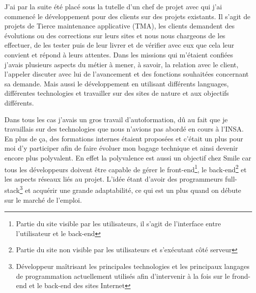 \documentclass[a4paper,11pt,twoside]{report}
\begin{document}
  J'ai par la suite été placé sous la tutelle d'un chef de projet avec qui j'ai commencé le développement pour des clients sur des projets existants. Il s'agit de projets de Tierce maintenance applicative (TMA), les clients demandent des évolutions ou des corrections sur leurs sites et nous nous chargeons de les effectuer, de les tester puis de leur livrer et de vérifier avec eux que cela leur convient et répond à leurs attentes. Dans les missions qui m'étaient confiées j'avais plusieurs aspects du métier à mener, à savoir, la relation avec le client, l'appeler discuter avec lui de l'avancement et des fonctions souhaitées concernant sa demande. Mais aussi le développement en utilisant différents languages, différentes technologies et travailler sur des sites de nature et aux objectifs différents.\newline 
  
  Dans tous les cas j'avais un gros travail d'autoformation, dû au fait que je travaillais sur des technologies que nous n'avions pas abordé en cours à l'INSA. En plus de ça, des formations internes étaient proposées et c'était un plus pour moi d'y participer afin de faire évoluer mon bagage technique et ainsi devenir encore plus polyvalent. En effet la polyvalence est aussi un objectif chez Smile car tous les développeurs doivent être capable de gérer le front-end\footnote{Partie du site visible par les utilisateurs, il s'agit de l'interface entre l'utilisateur et le back-end}, le back-end\footnote{Partie du site non visible par les utilisateurs et s'exécutant côté serveur} et les aspects réseaux liés au projet. L'idée étant d'avoir des programmeurs full-stack\footnote{Développeur maîtrisant les principales technologies et les principaux langages de programmation actuellement utilisés afin d'intervenir à la fois sur le frond-end et le back-end des sites Internet} et acquérir une grande adaptabilité, ce qui est un plus quand on débute sur le marché de l'emploi.\newline
  
\end{document}
